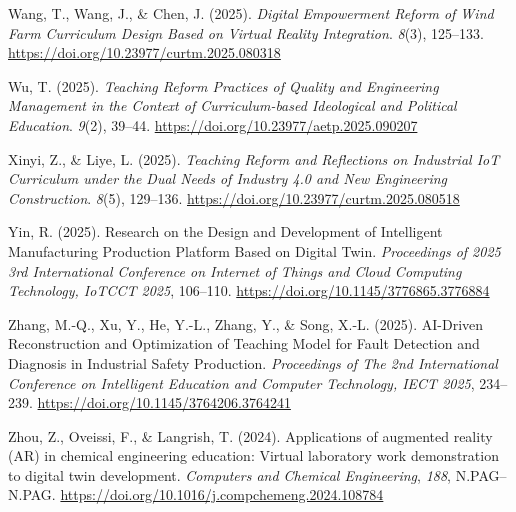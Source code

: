 Wang, T., Wang, J., \& Chen, J. (2025). \emph{Digital Empowerment Reform of
Wind Farm Curriculum Design Based on Virtual Reality Integration}.
\emph{8}(3), 125--133. \url{https://doi.org/10.23977/curtm.2025.080318}

Wu, T. (2025). \emph{Teaching Reform Practices of Quality and Engineering
Management in the Context of Curriculum-based Ideological and Political
Education}. \emph{9}(2), 39--44. \url{https://doi.org/10.23977/aetp.2025.090207}

Xinyi, Z., \& Liye, L. (2025). \emph{Teaching Reform and Reflections on
Industrial IoT Curriculum under the Dual Needs of Industry 4.0 and New
Engineering Construction}. \emph{8}(5), 129--136.
\url{https://doi.org/10.23977/curtm.2025.080518}

Yin, R. (2025). Research on the Design and Development of Intelligent
Manufacturing Production Platform Based on Digital Twin. \emph{Proceedings of
2025 3rd International Conference on Internet of Things and Cloud
Computing Technology, IoTCCT 2025}, 106--110.
\url{https://doi.org/10.1145/3776865.3776884}

Zhang, M.-Q., Xu, Y., He, Y.-L., Zhang, Y., \& Song, X.-L. (2025).
AI-Driven Reconstruction and Optimization of Teaching Model for Fault
Detection and Diagnosis in Industrial Safety Production. \emph{Proceedings of
The 2nd International Conference on Intelligent Education and Computer
Technology, IECT 2025}, 234--239.
\url{https://doi.org/10.1145/3764206.3764241}

Zhou, Z., Oveissi, F., \& Langrish, T. (2024). Applications of augmented
reality (AR) in chemical engineering education: Virtual laboratory work
demonstration to digital twin development. \emph{Computers and Chemical
Engineering}, \emph{188}, N.PAG--N.PAG.
\url{https://doi.org/10.1016/j.compchemeng.2024.108784}
